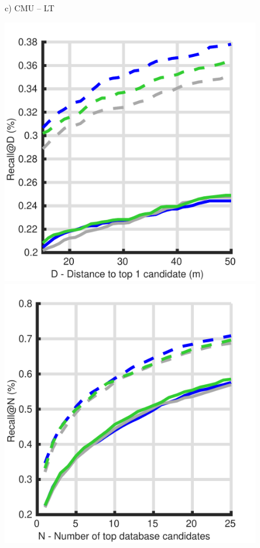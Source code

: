 \begin{figure}
\begin{minipage}{0.27\linewidth}
		c) CMU -- LT
	\end{minipage}
	\begin{minipage}{0.27\linewidth}
		\center \scriptsize
		\includegraphics[width=\linewidth]{plot/depth_vs_ref/Results_cmu_snow/distance}	
		
		\includegraphics[width=\linewidth]{plot/depth_vs_ref/Results_cmu_snow/recall}
		

\end{minipage}
\end{figure}
